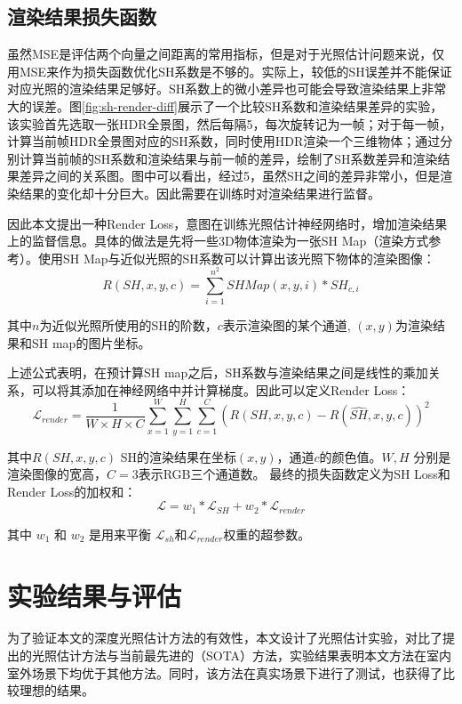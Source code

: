 \subsection{渲染结果损失函数} 虽然MSE是评估两个向量之间距离的常用指标，但是对于光照估计问题来说，仅用MSE来作为损失函数优化SH系数是不够的。实际上，较低的SH误差并不能保证对应光照的渲染结果足够好。SH系数上的微小差异也可能会导致渲染结果上非常大的误差。图\ref{fig:sh-render-diff}展示了一个比较SH系数和渲染结果差异的实验，该实验首先选取一张HDR全景图，然后每隔5，每次旋转记为一帧；对于每一帧，计算当前帧HDR全景图对应的SH系数，同时使用HDR渲染一个三维物体；通过分别计算当前帧的SH系数和渲染结果与前一帧的差异，绘制了SH系数差异和渲染结果差异之间的关系图。图中可以看出，经过5，虽然SH之间的差异非常小，但是渲染结果的变化却十分巨大。因此需要在训练时对渲染结果进行监督。



因此本文提出一种Render Loss，意图在训练光照估计神经网络时，增加渲染结果上的监督信息。具体的做法是先将一些3D物体渲染为一张SH Map（渲染方式参考\cite{green2003spherical}）。使用SH Map与近似光照的SH系数可以计算出该光照下物体的渲染图像：
\begin{equation}
    R(SH, x, y, c) = \sum^{n^2}_{i=1}SHMap(x,y,i)*SH_{c,i}
\end{equation}

其中$n$为近似光照所使用的SH的阶数，$c$表示渲染图的某个通道, $(x, y)$为渲染结果和SH map的图片坐标。

上述公式表明，在预计算SH map之后，SH系数与渲染结果之间是线性的乘加关系，可以将其添加在神经网络中并计算梯度。因此可以定义Render Loss：
\begin{equation}
    \label{eq:render-loss}
    \mathcal{L}_{render} = \frac{1}{W\times H\times C} \sum_{x=1}^{W}\sum_{y=1}^{H}\sum_{c=1}^{C}(R(SH,x,y,c)-R(\hat{SH},x,y,c))^{2}
\end{equation}

其中$R(SH,x,y,c)$ SH的渲染结果在坐标$(x,y)$，通道$c$的颜色值。$W, H$ 分别是渲染图像的宽高，$C=3$表示RGB三个通道数。
最终的损失函数定义为SH Loss和Render Loss的加权和：
\begin{equation}
    \label{eq:loss-function}
    \mathcal{L} =w_{1}*\mathcal{L}_{SH}+w_{2}*\mathcal{L}_{render}
\end{equation}

 其中 $w_1$ 和 $w_2$ 是用来平衡 $\mathcal{L}_{sh}$和$\mathcal{L}_{render}$权重的超参数。
\section{实验结果与评估}\label{sec:experiment}
为了验证本文的深度光照估计方法的有效性，本文设计了光照估计实验，对比了提出的光照估计方法与当前最先进的（SOTA）方法，实验结果表明本文方法在室内室外场景下均优于其他方法。同时，该方法在真实场景下进行了测试，也获得了比较理想的结果。
